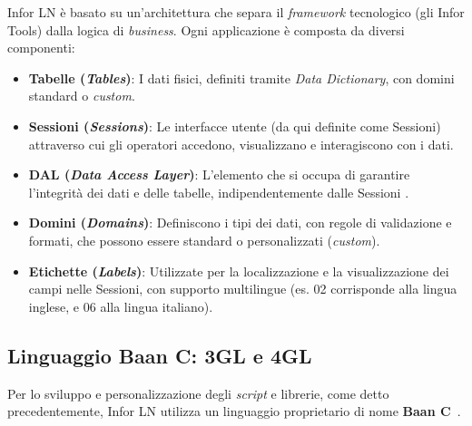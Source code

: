 Infor LN è basato su un'architettura che separa il \textit{framework} tecnologico (gli Infor Tools) dalla logica di \textit{business}.
Ogni applicazione è composta da diversi componenti:
\begin{itemize}
    \item \textbf{Tabelle (\textit{Tables})}: I dati fisici, definiti tramite \textit{Data Dictionary}, con domini standard o \textit{custom}.
    \item \textbf{Sessioni (\textit{Sessions})}: Le interfacce utente (da qui definite come Sessioni) attraverso cui gli operatori accedono, visualizzano e interagiscono con i dati.
    \item \textbf{DAL (\textit{Data Access Layer})}: L'elemento che si occupa di garantire l'integrità dei dati e delle tabelle, indipendentemente dalle Sessioni \cite{inforDalGuide}.
    \item \textbf{Domini (\textit{Domains})}: Definiscono i tipi dei dati, con regole di validazione e formati, che possono essere standard o personalizzati (\textit{custom}).
    \item \textbf{Etichette (\textit{Labels})}: Utilizzate per la localizzazione e la visualizzazione dei campi nelle Sessioni, con supporto multilingue (es.
    02 corrisponde alla lingua inglese, e 06 alla lingua italiano).
\end{itemize}

\subsection{Linguaggio Baan C: 3GL e 4GL}\label{subsec:linguaggio-baan-c:-3gl-e-4gl}
Per lo sviluppo e personalizzazione degli \textit{script} e librerie, come detto precedentemente, Infor LN utilizza un linguaggio proprietario di nome \textbf{Baan C}~\cite{infor3GL4GL}.

